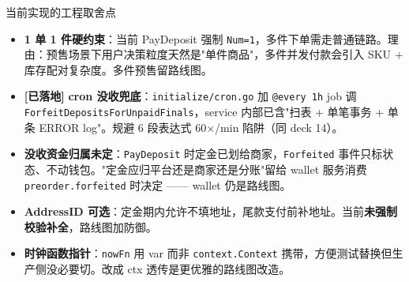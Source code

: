 \documentclass[aspectratio=169,11pt]{beamer}
\begin{document}
\begin{frame}[shrink]{当前实现的工程取舍点}
\begin{itemize}\small
  \item \textbf{1 单 1 件硬约束}：当前 PayDeposit 强制 \texttt{Num=1}，多件下单需走普通链路。理由：预售场景下用户决策粒度天然是"单件商品"，多件并发付款会引入 SKU + 库存配对复杂度。多件预售留路线图。
  \item \textcolor{cOK}{\textbf{[已落地]}} \textbf{cron 没收兜底}：\texttt{initialize/cron.go} 加 \texttt{@every 1h} job 调 \texttt{ForfeitDepositsForUnpaidFinals}，service 内部已含"扫表 + 单笔事务 + 单条 ERROR log"。规避 6 段表达式 60×/min 陷阱（同 deck 14）。
  \item \textbf{没收资金归属未定}：\texttt{PayDeposit} 时定金已划给商家，\texttt{Forfeited} 事件只标状态、不动钱包。"定金应归平台还是商家还是分账"留给 wallet 服务消费 \texttt{preorder.forfeited} 时决定 —— wallet 仍是路线图。
  \item \textbf{AddressID 可选}：定金期内允许不填地址，尾款支付前补地址。当前\textbf{未强制校验补全}，路线图加防御。
  \item \textbf{时钟函数指针}：\texttt{nowFn} 用 var 而非 \texttt{context.Context} 携带，方便测试替换但生产侧没必要切。改成 ctx 透传是更优雅的路线图改造。
\end{itemize}
\end{frame}

\appendix
\end{document}
